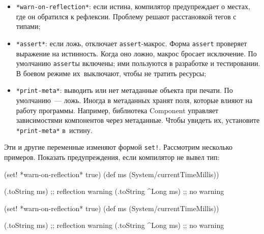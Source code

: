 \begin{itemize}


\item
  \verb|*warn-on-reflection*|: если истина, компилятор предупреждает о местах,
  где он обратился к рефлексии. Проблему решают расстановкой тегов с типами;


\item
  \verb|*assert*|: если ложь, отключает \verb|assert|-макрос. Форма
  \verb|assert| проверяет выражение на истинность. Когда оно ложно, макрос
  бросает исключение.  По умолчанию \verb|assert|ы включены; ими пользуются в
  разработке и тестировании. В боевом режиме их~выключают, чтобы не тратить
  ресурсы;

\label{print-meta}


\item
  \verb|*print-meta*|: выводить или нет метаданные объекта при печати. По
  умолчанию~--- ложь. Иногда в метаданных хранят поля, которые влияют на работу
  программы. Например, библиотека Component управляет зависимостями компонентов
  через метаданные. Чтобы увидеть их, установите \verb|*print-meta*| в~истину.

\end{itemize}

Эти и другие переменные изменяют формой \verb|set!|. Рассмотрим несколько
примеров. Показать предупреждения, если компилятор не вывел тип:

\ifx\DEVICETYPE\MOBILE

\begin{english}
  \begin{clojure}
(set! *warn-on-reflection* true)
(def ms (System/currentTimeMillis))

(.toString ms) ;; reflection warning
(.toString ^Long ms) ;; no warning
  \end{clojure}
\end{english}

\else

\begin{english}
  \begin{clojure}
(set! *warn-on-reflection* true)
(def ms (System/currentTimeMillis))

(.toString ms)       ;; reflection warning
(.toString ^Long ms) ;; no warning
  \end{clojure}
\end{english}

